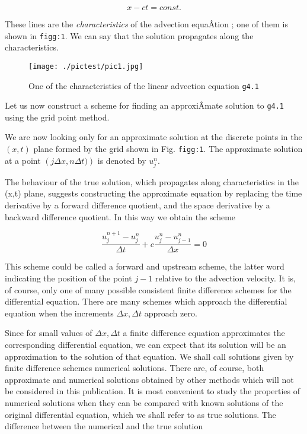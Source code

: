 \[x - ct = const.\]

These lines are the \emph{characteristics} of the advection equaÂ­tion ;
one of them is shown in \texttt{figg:1}. We can say that the solution
propagates along the characteristics.

\begin{figure}
\centering
\texttt{[image: ./pictest/pic1.jpg]}
\caption{One of the characteristics of the linear advection equation
\texttt{g4.1}}
\end{figure}

Let us now construct a scheme for finding an approxiÂ­mate solution to
\texttt{g4.1} using the grid point method.

We are now looking only for an approximate solution at the discrete
points in the \((x,t)\) plane formed by the grid shown in Fig.
\texttt{figg:1}. The approximate solution at a point
\(\left( j\Delta x, n\Delta t) \right)\) is denoted by \(u_{j}^{n}\).

\begin{figure}
\centering
{}
\caption{}
\end{figure}

The behaviour of the true solution, which propagates along
characteristics in the (x,t) plane, suggests constructing the
approximate equation by replacing the time derivative by a forward
difference quotient, and the space derivative by a backward difference
quotient. In this way we obtain the scheme

{\[\frac{u_{j}^{n + 1} - u_{j}^{n}}{\Delta t} + c\frac{u_j^n - u_{j - 1}^n}{\Delta x} = 0\]}

This scheme could be called a forward and upstream scheme, the latter
word indicating the position of the point \(j - 1\) relative to the
advection velocity. It is, of course, only one of many possible
consistent finite difference schemes for the differential equation.
There are many schemes which approach the differential equation when the
increments \(\Delta x,\Delta t\) approach zero.

Since for small values of \(\Delta x,\Delta t\) a finite difference
equation approximates the corresponding differential equation, we can
expect that its solution will be an approximation to the solution of
that equation. We shall call solutions given by finite difference
schemes numerical solutions. There are, of course, both approximate and
numerical solutions obtained by other methods which will not be
considered in this publication. It is most convenient to study the
properties of numerical solutions when they can be compared with known
solutions of the original differential equation, which we shall refer to
as true solutions. The difference between the numerical and the true
solution

